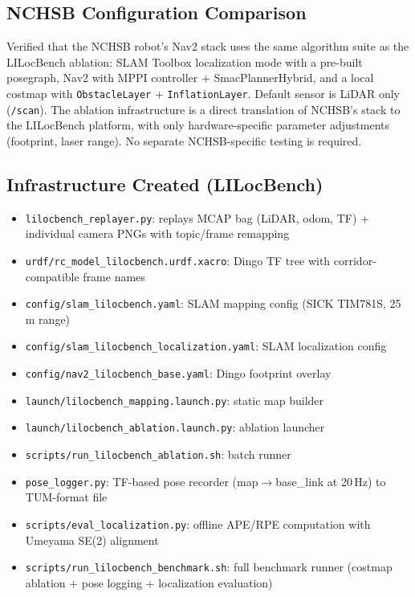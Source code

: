 \documentclass[11pt,a4paper]{article}
\begin{document}
\subsection{NCHSB Configuration Comparison}

Verified that the NCHSB robot's Nav2 stack uses the same algorithm
suite as the LILocBench ablation: SLAM Toolbox localization mode with
a pre-built posegraph, Nav2 with MPPI controller + SmacPlannerHybrid,
and a local costmap with \texttt{ObstacleLayer} + \texttt{InflationLayer}.
Default sensor is LiDAR only (\texttt{/scan}).  The ablation infrastructure
is a direct translation of NCHSB's stack to the LILocBench platform,
with only hardware-specific parameter adjustments (footprint, laser range).
No separate NCHSB-specific testing is required.

\subsection{Infrastructure Created (LILocBench)}

\begin{itemize}[nosep]
  \item \texttt{lilocbench\_replayer.py}: replays MCAP bag (LiDAR, odom,
    TF) + individual camera PNGs with topic/frame remapping
  \item \texttt{urdf/rc\_model\_lilocbench.urdf.xacro}: Dingo TF tree
    with corridor-compatible frame names
  \item \texttt{config/slam\_lilocbench.yaml}: SLAM mapping config
    (SICK TIM781S, 25\,m range)
  \item \texttt{config/slam\_lilocbench\_localization.yaml}: SLAM
    localization config
  \item \texttt{config/nav2\_lilocbench\_base.yaml}: Dingo footprint
    overlay
  \item \texttt{launch/lilocbench\_mapping.launch.py}: static map builder
  \item \texttt{launch/lilocbench\_ablation.launch.py}: ablation launcher
  \item \texttt{scripts/run\_lilocbench\_ablation.sh}: batch runner
  \item \texttt{pose\_logger.py}: TF-based pose recorder
    (map$\to$base\_link at 20\,Hz) to TUM-format file
  \item \texttt{scripts/eval\_localization.py}: offline APE/RPE
    computation with Umeyama SE(2) alignment
  \item \texttt{scripts/run\_lilocbench\_benchmark.sh}: full benchmark
    runner (costmap ablation + pose logging + localization evaluation)
\end{itemize}
\end{document}

